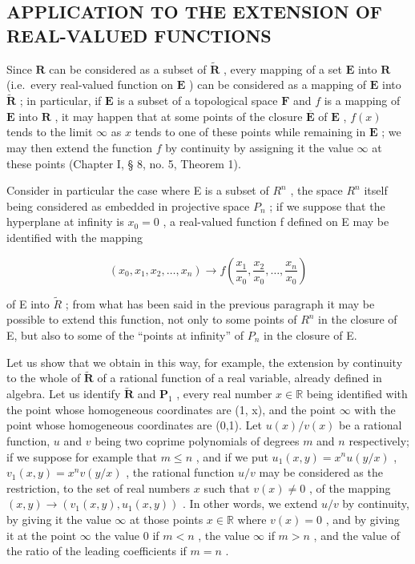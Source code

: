 \subsection{APPLICATION TO THE EXTENSION OF REAL-VALUED FUNCTIONS}

Since \(\mathbf{R}\) can be considered as a subset of \(\tilde{\mathbf{R}}\) , every mapping of a set \(\mathbf{E}\) into \(\mathbf{R}\) (i.e.~every real-valued function on \(\mathbf{E}\) ) can be considered as a mapping of \(\mathbf{E}\) into \(\tilde{\mathbf{R}}\) ; in particular, if \(\mathbf{E}\) is a subset of a topological space \(\mathbf{F}\) and \(f\) is a mapping of \(\mathbf{E}\) into \(\mathbf{R}\) , it may happen that at some points of the closure \(\overline{\mathbf{E}}\) of \(\mathbf{E}\) , \(f(x)\) tends to the limit \(\infty\) as \(x\) tends to one of these points while remaining in \(\mathbf{E}\) ; we may then extend the function \(f\) by continuity by assigning it the value \(\infty\) at these points (Chapter I, § 8, no. 5, Theorem 1).

Consider in particular the case where E is a subset of \(R^{n}\) , the space \(R^{n}\) itself being considered as embedded in projective space \(P_{n}\) ; if we suppose that the hyperplane at infinity is \(x_{0}=0\) , a real-valued function f defined on E may be identified with the mapping

\[
(x _ {0}, x _ {1}, x _ {2}, \ldots , x _ {n}) \rightarrow f \left(\frac {x _ {1}}{x _ {0}}, \frac {x _ {2}}{x _ {0}}, \ldots , \frac {x _ {n}}{x _ {0}}\right)
\]

of E into \(\tilde{R}\) ; from what has been said in the previous paragraph it may be possible to extend this function, not only to some points of \(R^{n}\) in the closure of E, but also to some of the ``points at infinity'' of \(P_{n}\) in the closure of E.

Let us show that we obtain in this way, for example, the extension by continuity to the whole of \(\tilde{\mathbf{R}}\) of a rational function of a real variable, already defined in algebra. Let us identify \(\tilde{\mathbf{R}}\) and \(\mathbf{P}_1\) , every real number \(x \in \mathbb{R}\) being identified with the point whose homogeneous coordinates are (1, x), and the point \(\infty\) with the point whose homogeneous coordinates are (0,1). Let \(u(x)/v(x)\) be a rational function, \(u\) and \(v\) being two coprime polynomials of degrees \(m\) and \(n\) respectively; if we suppose for example that \(m \leqslant n\) , and if we put \(u_1(x,y) = x^n u(y/x)\) , \(v_1(x,y) = x^n v(y/x)\) , the rational function \(u/v\) may be considered as the restriction, to the set of real numbers \(x\) such that \(v(x) \neq 0\) , of the mapping \((x,y) \to (v_1(x,y), u_1(x,y))\) . In other words, we extend \(u/v\) by continuity, by giving it the value \(\infty\) at those points \(x \in \mathbb{R}\) where \(v(x) = 0\) , and by giving it at the point \(\infty\) the value \(0\) if \(m < n\) , the value \(\infty\) if \(m > n\) , and the value of the ratio of the leading coefficients if \(m = n\) .

